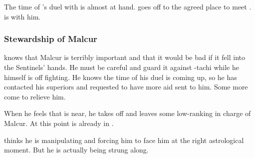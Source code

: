 The time of \Teshrial's duel with \Ishnaruchaefir is almost at hand.
\Teshrial goes off to the agreed place to meet \Ishnaruchaefir.
\Menessiaraid is with him. 





\subsubsection{Stewardship of Malcur}
\Teshrial{} knows that Malcur is terribly important and that it would be bad if it fell into the Sentinels' hands. 
He must be careful and guard it against \Psyrex-tachi while he himself is off fighting. 
He knows the time of his duel is coming up, so he has contacted his superiors and requested to have more aid sent to him. 
Some more \resphain{} come to relieve him. 

When he feels that \Ishnaruchaefir{} is near, he takes off and leaves some low-ranking \resphain{} in charge of Malcur. 
At this point \Achsah{} is already in \Forclin. 

\Teshrial{} thinks he is manipulating \Ishnaruchaefir{} and forcing him to face him at the right astrological moment. 
But he is actually being strung along. 

